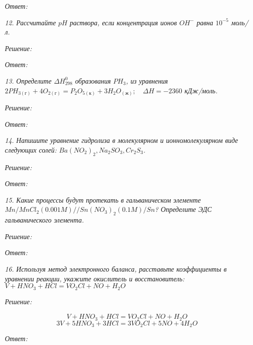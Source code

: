 \emph{Ответ: }

\pagebreak

\emph{12. Рассчитайте \( pH \) раствора, если концентрация ионов 
\( OH^{-} \) равна \( 10^{-5} \) моль/л.}

\emph{Решение:}

\emph{Ответ: }

\pagebreak

\emph{13. Определите \( \Delta H^{0}_{298} \) образования \( PH_3\), 
из уравнения 
\(
    2PH_{3(\text{г})} + 4O_{2(\text{г})} = 
    P_2 O_{5(\text{к})} + 3H_2 O_{(\text{ж})};\quad
    \Delta H = -2360 
\) кДж/моль.}

\emph{Решение:}

\emph{Ответ: }

\pagebreak

\emph{14. Напишите уравнение гидролиза в молекулярном и 
ионномолекулярном виде следующих солей: 
\( Ba(NO_2)_2, Na_2 SO_3, Cr_2 S_3 \).}

\emph{Решение:}

\emph{Ответ: }

\pagebreak

\emph{15. Какие процессы будут протекать в гальваническом элементе 
\( Mn/MnCl_2(0.001 M)//Sn(NO_3)_2(0.1 M)/Sn \)? 
Определите ЭДС гальванического элемента.}

\emph{Решение:}

\emph{Ответ: }

\pagebreak

\emph{16. Используя метод электронного баланса, расставьте коэффициенты 
в уравнении реакции, укажите окислитель и восстановитель:
\( V + HNO_3 + HCl = VO_2 Cl + NO + H_2 O \) }

\emph{Решение:}

\[ 
	\stackrel{}{V} + \stackrel{}{H}\stackrel{}{N}\stackrel{}{O}_3 + 
	\stackrel{}{H}\stackrel{}{Cl} = \stackrel{}{V}\stackrel{}{O}_2
	\stackrel{}{Cl} + 
	\stackrel{}{N}\stackrel{}{O} + \stackrel{}{H}_2\stackrel{}{O} 
\]
\[ 3V + 5HNO_3 + 3HCl = 3VO_2 Cl + 5NO + 4H_2 O \]

\emph{Ответ: }

\pagebreak

